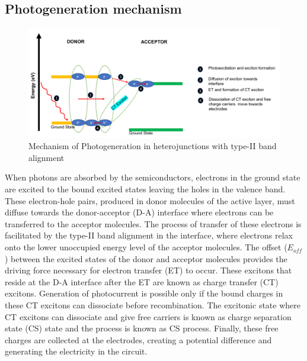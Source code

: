 \documentclass[12pt]{article}
\begin{document}
\subsection{Photogeneration mechanism}
\begin{figure}[H]
    \centering
    \includegraphics[scale = 0.6]{mechanism-CT.png}
    \caption{Mechanism of Photogeneration in heterojunctions with type-II band alignment}
    \label{fig:my_label}
\end{figure}
When photons are absorbed by the semiconductors, electrons in the ground state are excited to the bound excited states leaving the holes in the valence band. These electron-hole pairs, produced in donor molecules of the active layer, must diffuse towards the donor-acceptor (D-A) interface where electrons can be transferred to the acceptor molecules. The process of transfer of these electrons is facilitated by the type-II band alignment in the interface, where electrons relax onto the lower unoccupied energy level of the acceptor molecules. The offset ($E_{off}$) between the excited states of the donor and acceptor molecules provides the driving force necessary for electron transfer (ET) to occur. These excitons that reside at the D-A interface after the ET are known as charge transfer (CT) excitons. Generation of photocurrent is possible only if the bound charges in these CT excitons can dissociate before recombination. The excitonic state where CT excitons can dissociate and give free carriers is known as charge separation state (CS) state and the process is known as CS process. Finally, these free charges are collected at the electrodes, creating a potential difference and generating the electricity in the circuit.
\end{document}
